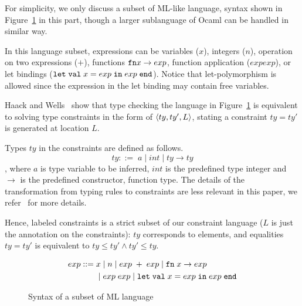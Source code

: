 For simplicity, we only discuss a subset of ML-like language, syntax shown in
Figure~\ref{figure:mltypes} in this part, though a larger sublanguage of Ocaml
can be handled in similar way.

In this language subset, expressions can be variables ($x$), integers ($n$),
operation on two expressions ($+$), functions $\mathtt{fn} x\rightarrow exp$, function
application ($exp exp$), or let bindings ($\mathtt{let}\; \mathtt{val}\; x = exp\; \mathtt{in}\;
exp\; \mathtt{end}$). Notice that let-polymorphism is allowed since the expression in
the let binding may contain free variables.

Haack and Wells~\cite{haack:slicing} show that type checking the language in
Figure~\ref{figure:mltypes} is equivalent to solving type constraints in the
form of $\langle ty,ty',L \rangle$, stating a constraint $ty = ty'$ is
generated at location $L$. 

Types $ty$ in the constraints are defined as follows.
\[ty ::=\; a \mid int \mid ty \rightarrow ty\]
, where $a$ is
type variable to be inferred, $int$ is the predefined type integer and
$\rightarrow$ is the predefined constructor, function type. The details of the
transformation from typing rules to constraints are less relevant in this
paper, we refer~\cite{haack:slicing} for more details. 

Hence, labeled constraints is a strict subset of our constraint language ($L$
is just the annotation on the constraints): $ty$ corresponds to elements, and
equalities $ty=ty'$ is equivalent to $ty\leq ty' \land ty'\leq ty$. 

\begin{figure}
\begin{minipage}{2in}
\begin{align*}
exp ::=\; & x \mid n \mid exp\; + \; exp \mid \mathtt{fn}\; x \rightarrow exp \\
        & \mid exp\; exp \mid \mathtt{let}\; \mathtt{val}\; x = exp\; \mathtt{in}\; exp\; \mathtt{end}\\
\end{align*}
\end{minipage}
\caption{Syntax of a subset of ML language}
\label{figure:mltypes}
\end{figure}


% 

